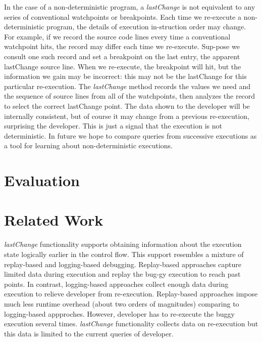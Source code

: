 \documentclass[preprint]{sigplanconf}
\begin{document}
In the case of a non-deterministic program, a \textit{lastChange} is not equivalent to any series of conventional watchpoints or breakpoints. Each time we re-execute a non-deterministic program, the details of execution in-struction order may change. For example, if we record the source code lines every time a conventional watchpoint hits, the record may differ each time we re-execute. Sup-pose we consult one such record and set a breakpoint on the last entry, the apparent lastChange source line. When we re-execute, the breakpoint will hit, but the information we gain may be incorrect: this may not be the lastChange for this particular re-execution. The \textit{lastChange} method records the values we need and the sequence of source lines from all of the watchpoints, then analyzes the record to select the correct lastChange point. The data shown to the developer will be internally consistent, but of course it may change from a previous re-execution, surprising the developer. This is just a signal that the execution is not deterministic. In future we hope to compare queries from successive executions as a tool for learning about non-deterministic executions.

\section{Evaluation}

\section{Related Work}

\textit{lastChange} functionality supports obtaining information about the execution state logically earlier in the control flow. This support resembles a mixture of replay-based and logging-based debugging. Replay-based approaches capture limited data during execution and replay the bug-gy execution to reach past points. In contrast, logging-based approaches collect enough data during execution to relieve developer from re-execution. Replay-based approaches impose much less runtime overhead (about two orders of magnitudes) comparing to logging-based appproches. However, developer has to re-execute the buggy execution several times. \textit{lastChange} functionality collects data on re-execution but this data is limited to the current queries of developer.
\end{document}
